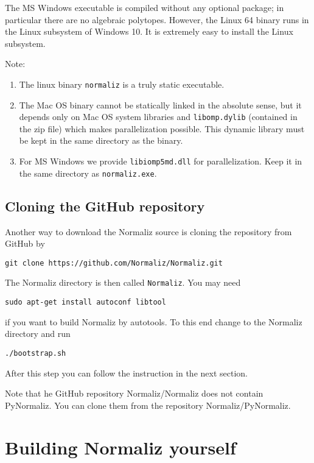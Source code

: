 \documentclass[12pt,a4paper]{scrartcl}
\theoremstyle{definition}
\begin{document}
The MS Windows executable is compiled without any optional package; in particular there are no algebraic polytopes. However, the Linux 64 binary runs in the Linux subsystem of Windows 10. It is extremely easy to install the Linux subsystem.

Note:
\begin{enumerate}
\item The linux binary \verb|normaliz| is a truly static executable. 

\item The Mac OS binary cannot be statically linked in the absolute sense, but it depends only on Mac OS system libraries and \verb|libomp.dylib| (contained in the zip file) which makes parallelization possible. This dynamic library must be kept in the same directory as the binary.

\item For MS Windows we provide \verb|libiomp5md.dll| for parallelization. Keep it in the same directory as \verb|normaliz.exe|.
\end{enumerate}

\subsection{Cloning the GitHub repository}

Another way to download the Normaliz source is cloning the repository from GitHub by
\begin{Verbatim}
git clone https://github.com/Normaliz/Normaliz.git
\end{Verbatim}
The Normaliz directory is then called \verb|Normaliz|. You may need
\begin{Verbatim}
sudo apt-get install autoconf libtool
\end{Verbatim}
if you want to build Normaliz by autotools. To this end change to the Normaliz directory and run
\begin{Verbatim}
./bootstrap.sh
\end{Verbatim}
After this step you can follow the instruction in the next section.

Note that he GitHub repository Normaliz/Normaliz does not contain PyNormaliz. You can clone them from the repository Normaliz/PyNormaliz.

\section{Building Normaliz yourself}\label{Compile}
\end{document}
